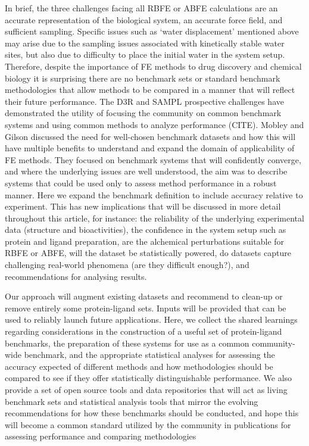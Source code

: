 \documentclass[9pt,bestpractices]{livecoms}
\begin{document}
In brief, the three challenges facing all RBFE or ABFE calculations are an accurate representation of the biological system, an accurate force field, and sufficient sampling. Specific issues such as ‘water displacement’ mentioned above may arise due to the sampling issues associated with kinetically stable water sites, but also due to difficulty to place the initial water in the system setup. Therefore, despite the importance of FE methods to drug discovery and chemical biology it is surprising there are no benchmark sets or standard benchmark methodologies that allow methods to be compared in a manner that will reflect their future performance. The D3R and SAMPL prospective challenges have demonstrated the utility of focusing the community on common benchmark systems and using common methods to analyze performance (CITE). Mobley and Gilson discussed the need for well-chosen benchmark datasets and how this will have multiple benefits to understand and expand the domain of applicability of FE methods\cite{mobleyPredictingBindingFree2017}. They focused on benchmark systems that will confidently converge, and where the underlying issues are well understood, the aim was to describe systems that could be used only to assess method performance in a robust manner. Here we expand the benchmark definition to include accuracy relative to experiment. This has new implications that will be discussed in more detail throughout this article, for instance: the reliability of the underlying experimental data (structure and bioactivities), the confidence in the system setup such as protein and ligand preparation, are the alchemical perturbations suitable for RBFE or ABFE, will the dataset be statistically powered, do datasets capture challenging real-world phenomena (are they difficult enough?), and recommendations for analysing results.   

Our approach will augment existing datasets and recommend to clean-up or remove entirely some protein-ligand sets. Inputs will be provided that can be used to reliably launch future applications. Here, we collect the shared learnings regarding considerations in the construction of a useful set of protein-ligand benchmarks, the preparation of these systems for use as a common community-wide benchmark, and the appropriate statistical analyses for assessing the accuracy expected of different methods and how methodologies should be compared to see if they offer statistically distinguishable performance. We also provide a set of open source tools and data repositories that will act as living benchmark sets and statistical analysis tools that mirror the evolving recommendations for how these benchmarks should be conducted, and hope this will become a common standard utilized by the community in publications for assessing performance and comparing methodologies  
\end{document}
